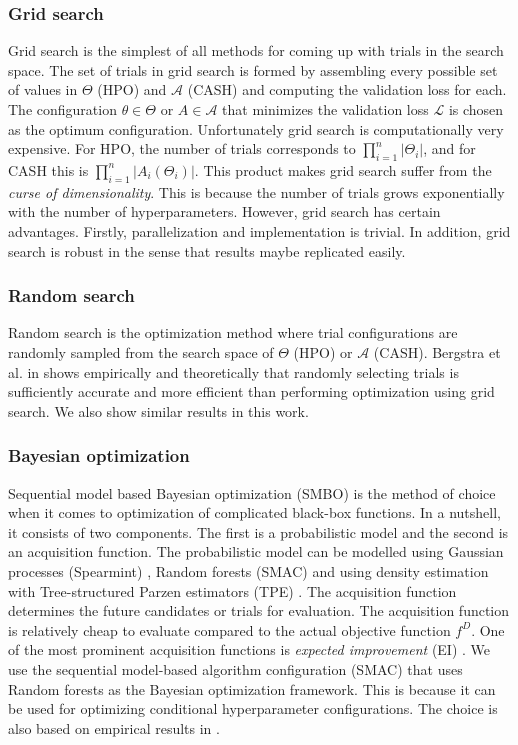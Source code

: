 \subsubsection{Grid search}
\label{grid}
Grid search is the simplest of all methods for coming up with trials in the search space. The set of trials in grid search is formed by assembling every possible set of values in $\Theta$ (HPO) and $\mathcal{A}$ (CASH) and computing the validation loss for each. The configuration $\theta \in \Theta$ or $A \in \mathcal{A}$ that minimizes the validation loss $\mathcal{L}$ is chosen as the optimum configuration. Unfortunately grid search is computationally very expensive. For HPO, the number of trials corresponds to $\prod_{i=1}^n |\Theta_i|$, and for CASH this is $\prod_{i=1}^n |A_i(\Theta_i)|$. This product makes grid search suffer from the \textit{curse of dimensionality}. This is because the number of trials grows exponentially with the number of hyperparameters. However, grid search has certain advantages. Firstly, parallelization and implementation is trivial. In addition, grid search is robust in the sense that results maybe replicated easily. 

\subsubsection{Random search}
\label{random}
Random search is the optimization method where trial configurations are randomly sampled from the search space of $\Theta$ (HPO) or $\mathcal{A}$ (CASH). Bergstra et al. in \cite{bergstra2012random} shows empirically and theoretically that randomly selecting trials is sufficiently accurate and more efficient than performing optimization using grid search. We also show similar results in this work.

\subsubsection{Bayesian optimization}
\label{Bayesian}
Sequential model based Bayesian optimization (SMBO) \cite{hutter2011sequential} is the method of choice when it comes to optimization of complicated black-box functions. In a nutshell, it consists of two components. The first is a probabilistic model and the second is an acquisition function. The probabilistic model can be modelled using Gaussian processes (Spearmint) \cite{snoek2012practical}, Random forests (SMAC) \cite{hutter2011sequential} and using density estimation with Tree-structured Parzen estimators (TPE) \cite{bergstra2011algorithms}. The acquisition function determines the future candidates or trials for evaluation. The acquisition function is relatively cheap to evaluate compared to the actual objective function $f^D$. One of the most prominent acquisition functions is \textit{expected improvement} (EI) \cite{expected_improvement}. We use the sequential model-based algorithm configuration (SMAC) that uses Random forests as the Bayesian optimization framework. This is because it can be used for optimizing conditional hyperparameter configurations. The choice is also based on empirical results in \cite{eggensperger2013towards}.

